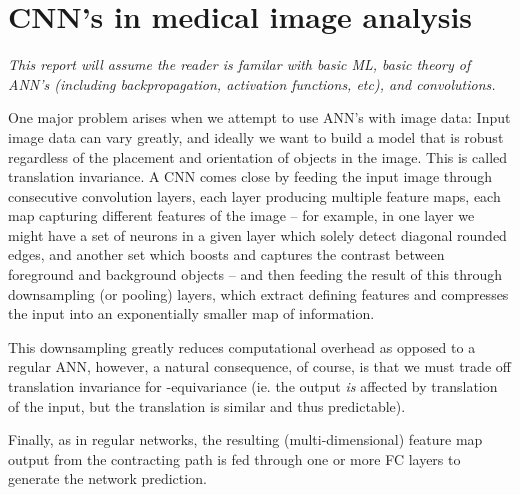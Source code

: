 \section{CNN's in medical image analysis}
\label{sec:cnn}

\emph{This report will assume the reader is familar with basic ML, basic theory
of ANN's (including backpropagation, activation functions, etc), and
convolutions.}





One major problem arises when we attempt to use ANN's with image data: Input image
data can vary greatly, and ideally we want to build a model that is robust
regardless of the placement and orientation of objects in the image. This is
called translation invariance. A CNN comes close by feeding the input image
through consecutive convolution layers, each layer producing multiple feature
maps, each map capturing different features of the image -- for example, in one
layer we might have a set of neurons in a given layer which solely detect
diagonal rounded edges, and another set which boosts and captures the contrast
between foreground and background objects -- and then feeding the result of this
through downsampling (or pooling) layers, which extract defining features and
compresses the input into an exponentially smaller map of information.

This downsampling greatly reduces computational overhead as opposed to a
regular ANN, however, a natural consequence, of course, is that we must trade
off translation invariance for -equivariance (ie. the output \emph{is}
affected by translation of the input, but the translation is similar and thus
predictable).


Finally, as in regular networks, the resulting (multi-dimensional) feature map
output from the contracting path is fed through one or more FC layers to
generate the network prediction.

